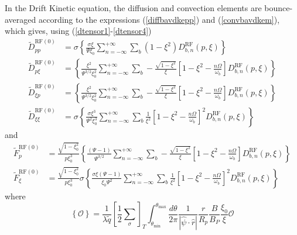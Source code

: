 
\label{dkerfwavesection}In the Drift Kinetic equation, the diffusion
and convection elements are bounce-averaged according to the
expressions (\ref{diffbavdkepp}) and (\ref{convbavdkem}), which
gives, using (\ref{dtensor1}-\ref{dtensor4})
\begin{align}
\widetilde{D}_{pp}^{\text{RF}(0)}  &  =\sigma\left\{  \frac{\sigma\xi}{\Psi
\xi_{0}}\sum_{n=-\infty}^{+\infty}\sum_{b}(1-\xi^{2})D_{b,n}^{\text{RF}}%
(p,\xi)\right\} \label{diffbavdkerf}\\
\widetilde{D}_{p\xi}^{\text{RF}(0)}  &  =\left\{  \frac{\xi^{2}}{\Psi^{3/2}%
\xi_{0}^{2}}\sum_{n=-\infty}^{+\infty}\sum_{b}-\frac{\sqrt{1-\xi^{2}}}{\xi
}\left[  1-\xi^{2}-\frac{n\Omega}{\omega_{b}}\right]  D_{b,n}^{\text{RF}%
}(p,\xi)\right\} \nonumber\\
\widetilde{D}_{\xi p}^{\text{RF}(0)}  &  =\left\{  \frac{\xi^{2}}{\Psi
^{3/2}\xi_{0}^{2}}\sum_{n=-\infty}^{+\infty}\sum_{b}-\frac{\sqrt{1-\xi^{2}}%
}{\xi}\left[  1-\xi^{2}-\frac{n\Omega}{\omega_{b}}\right]  D_{b,n}^{\text{RF}%
}(p,\xi)\right\} \nonumber\\
\widetilde{D}_{\xi\xi}^{\text{RF}(0)}  &  =\sigma\left\{  \frac{\sigma\xi^{3}%
}{\Psi^{2}\xi_{0}^{3}}\sum_{n=-\infty}^{+\infty}\sum_{b}\frac{1}{\xi^{2}%
}\left[  1-\xi^{2}-\frac{n\Omega}{\omega_{b}}\right]  ^{2}D_{b,n}^{\text{RF}%
}(p,\xi)\right\} \nonumber
\end{align}
and%
\begin{align}
\widetilde{F}_{p}^{\text{RF}(0)}  &  =\frac{\sqrt{1-\xi_{0}^{2}}}{p\xi_{0}%
^{3}}\left\{  \frac{\left(  \Psi-1\right)  }{\Psi^{3/2}}\sum_{n=-\infty
}^{+\infty}\sum_{b}-\frac{\sqrt{1-\xi^{2}}}{\xi}\left[  1-\xi^{2}%
-\frac{n\Omega}{\omega_{b}}\right]  D_{b,n}^{\text{RF}}(p,\xi)\right\}
\label{convbavdkerf}\\
\widetilde{F}_{\xi}^{\text{RF}(0)}  &  =\frac{\sqrt{1-\xi_{0}^{2}}}{p\xi
_{0}^{3}}\sigma\left\{  \frac{\sigma\xi\left(  \Psi-1\right)  }{\xi_{0}%
\Psi^{2}}\sum_{n=-\infty}^{+\infty}\sum_{b}\frac{1}{\xi^{2}}\left[  1-\xi
^{2}-\frac{n\Omega}{\omega_{b}}\right]  ^{2}D_{b,n}^{\text{RF}}(p,\xi)\right\}
\nonumber
\end{align}
where
\begin{equation}
\left\{  \mathcal{O}\right\}  =\frac{1}{\lambda\widetilde{q}}\left[  \frac
{1}{2}\sum\limits_{\sigma}\right]  _{T}\int_{\theta_{\min}}^{\theta_{\max}%
}\frac{d\theta}{2\pi}\frac{1}{\left|  \widehat{\psi}\cdot\widehat{r}\right|
}\frac{r}{R_{p}}\frac{B}{B_{P}}\frac{\xi_{0}}{\xi}\mathcal{O}%
\end{equation}

